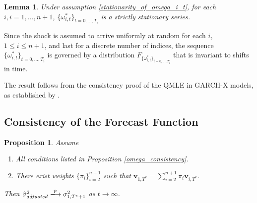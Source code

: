 \documentclass[11pt,3p,review,authoryear]{elsarticle}
\newcommand{\weight}{\pi}
\newtheorem{lem}{Lemma}
\newtheorem{prop}{Proposition}
\theoremstyle{definition}
\newenvironment{proof-of-proposition}[1][{}]{\noindent{\bf
    Proof of Proposition {#1}}
  \hspace*{.5em}}{\qed\bigskip\\}
\newenvironment{proof-of-lemma}[1][{}]{\noindent{\bf
Proof of Lemma {#1}}
\hspace*{.5em}}{\qed\bigskip\\}
\begin{document}
\begin{lem}
  Under assumption \ref{stationarity_of_omega_i_t}, for each $i, i=1,...,n+1$,  $\{\omega_{i,t}^{*}\}_{t=0,...,T_i}$ is a strictly stationary series.
\end{lem}

\begin{proof-of-lemma}
Since the shock is assumed to arrive uniformly at random for each $i$, $1 \leq i \leq n + 1$, and last for a discrete number of indices, the sequence $\{\omega_{i,t}^{*}\}_{t=0,...,T_i}$ is governed by a distribution $F_{\{\omega_{i,t}^{*}\}_{t=0,...,T_i}}$ that is invariant to shifts in time.
\end{proof-of-lemma}

\begin{proof-of-proposition}
The result follows from the consistency proof of the QMLE in GARCH-X models, as established by \citet{han2014asymptotic}. 
\end{proof-of-proposition}

  \subsection{Consistency of the Forecast Function}
  \begin{prop}\label{sigma_consistency}
    Assume
    \begin{enumerate}
      \item All conditions listed in Proposition \ref{omega_consistency}.
      \item There exist weights $\{\pi_{i}\}_{i=2}^{n+1}$ such that $\textbf{v}_{1,T^{*}} = \sum^{n+1}_{i=2}\weight_{i} \textbf{v}_{i,T^{*}}$.
     \end{enumerate}
  Then $\hat\sigma^{2}_{adjusted}\xlongrightarrow{p}\sigma^{2}_{1,T^{*}+1}$ as $t\rightarrow\infty$. 
  \end{prop}
\end{document}
